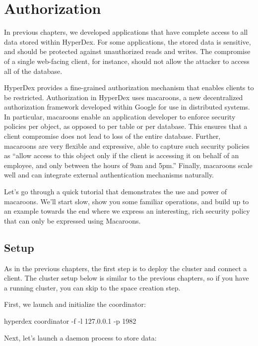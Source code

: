 \chapter{Authorization}
\label{chap:auth}

In previous chapters, we developed applications that have complete access to all
data stored within HyperDex.  For some applications, the stored data is
sensitive, and should be protected against unauthorized reads and writes.  The
compromise of a single web-facing client, for instance, should not allow the
attacker to access all of the database.

HyperDex provides a fine-grained authorization mechanism that enables clients to
be restricted.  Authorization in HyperDex uses macaroons, a new decentralized
authorization framework developed within Google for use in distributed systems.
In particular, macaroons enable an application developer to enforce security
policies per object, as opposed to per table or per database.  This ensures that
a client compromise does not lead to loss of the entire database.  Further,
macaroons are very flexible and expressive, able to capture such security
policies as ``allow access to this object only if the client is accessing it on
behalf of an employee, and only between the hours of 9am and 5pm.'' Finally,
macaroons scale well and can integrate external authentication mechanisms
naturally.

Let's go through a quick tutorial that demonstrates the use and power of
macaroons.  We'll start slow, show you some familiar operations, and build up to
an example towards the end where we express an interesting, rich security policy
that can only be expressed using Macaroons.

\section{Setup}
\label{sec:documents:setup}

As in the previous chapters, the first step is to deploy the cluster and connect
a client.  The cluster setup below is similar to the previous chapters, so if
you have a running cluster, you can skip to the space creation step.

First, we launch and initialize the coordinator:

\begin{consolecode}
hyperdex coordinator -f -l 127.0.0.1 -p 1982
\end{consolecode}

Next, let's launch a daemon process to store data:

